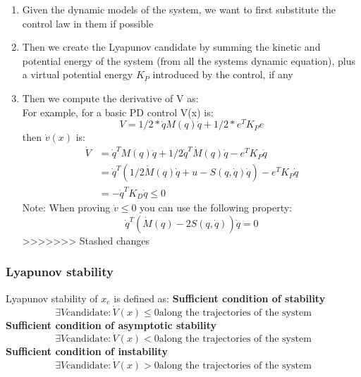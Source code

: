 \documentclass[a4paper,12pt]{article}
\begin{document}
\begin{enumerate}
=======
    \item Given the dynamic models of the system, we want 
    to first substitute the control law in them if possible
    \item Then we create the Lyapunov candidate by summing 
    the kinetic and potential energy of the system 
    (from all the systems dynamic equation), plus a virtual potential energy
    $K_P$ introduced by the control, if any 
    \item Then we compute the derivative of V as:\\
    For example, for a basic PD control V(x) is:
    \begin{equation}
        V=1/2*\dot{q}M(q)\dot{q}+1/2*e^TK_Pe
    \end{equation}
    then $\dot{v}(x)$ is:
    \begin{equation}
    \begin{split}
        \dot{V} & = \dot{q}^TM(q)\ddot{q}+ 1/2 \dot{q}^T\dot{M}(q)\dot{q} - e^TK_P\dot{q}\\
        & = \dot{q}^T(1/2\dot{M}(q)\dot{q}+u-S(q,\dot{q})\dot{q}) - e^TK_P\dot{q}\\
        & = -\dot{q}^TK_D\dot{q} \leq 0
    \end{split}
    \end{equation}
    Note: When proving $\dot{v} \leq 0$ you can use the following property:
    \begin{equation}
        \dot{q}^T(\dot{M}(q)-2S(q,\dot{q}))\dot{q}=0
    \end{equation}
>>>>>>> Stashed changes
\end{enumerate}
    \subsubsection{Lyapunov stability}
Lyapunov stability of $x_e$ is defined as:\newline
\textbf{Sufficient condition of stability}
\begin{equation}
    \exists V \text{candidate} : \dot{V}(x) \leq 0 \text{along the trajectories of the system}
\end{equation}
\textbf{Sufficient condition of asymptotic stability}
\begin{equation}
    \exists V \text{candidate} : \dot{V}(x) < 0 \text{along the trajectories of the system}
\end{equation}
\textbf{Sufficient condition of instability}
\begin{equation}
    \exists V \text{candidate} : \dot{V}(x) > 0 \text{along the trajectories of the system}
\end{equation}
\end{document}
